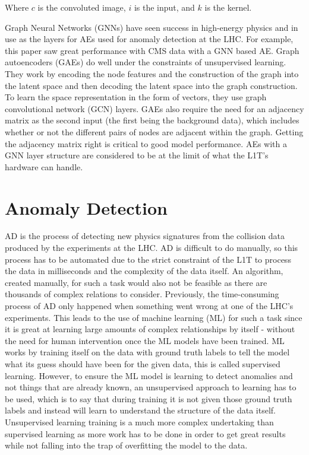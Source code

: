 \documentclass[a4paper]{article}
\theoremstyle{plain}
\theoremstyle{definition}
\begin{document}
    Where $c$ is the convoluted image, $i$ is the input, and $k$ is the kernel.
    
    Graph Neural Networks (GNNs) have seen success in high-energy physics \cite{gnn1, garnet2} and in use as the layers for AEs used for anomaly detection at the LHC. For example, this paper \cite{garnet2} saw great performance with CMS data with a GNN based AE. Graph autoencoders (GAEs) do well under the constraints of unsupervised learning. They work by encoding the node features and the construction of the graph into the latent space and then decoding the latent space into the graph construction. To learn the space representation in the form of vectors, they use graph convolutional network (GCN) layers. GAEs also require the need for an adjacency matrix as the second input (the first being the background data), which includes whether or not the different pairs of nodes are adjacent within the graph. Getting the adjacency matrix right is critical to good model performance. AEs with a GNN layer structure are considered to be at the limit of what the L1T's hardware can handle.
	
    \section{Anomaly Detection}
	\label{sec:ad}
	
	AD is the process of detecting new physics signatures from the collision data produced by the experiments at the LHC. AD is difficult to do manually, so this process has to be automated due to the strict constraint of the L1T to process the data in milliseconds and the complexity of the data itself. An algorithm, created manually, for such a task would also not be feasible as there are thousands of complex relations to consider. Previously, the time-consuming process of AD only happened when something went wrong at one of the LHC's experiments. This leads to the use of machine learning (ML) for such a task since it is great at learning large amounts of complex relationships by itself - without the need for human intervention once the ML models have been trained. ML works by training itself on the data with ground truth labels to tell the model what its guess should have been for the given data, this is called supervised learning. However, to ensure the ML model is learning to detect anomalies and not things that are already known, an unsupervised approach to learning has to be used, which is to say that during training it is not given those ground truth labels and instead will learn to understand the structure of the data itself. Unsupervised learning training is a much more complex undertaking than supervised learning as more work has to be done in order to get great results while not falling into the trap of overfitting the model to the data. 
	
\end{document}
